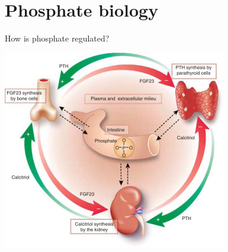 \documentclass[compress]{beamer}
\begin{document}
\section{Phosphate biology}
\begin{frame}{How is phosphate regulated?  }
	\begin{center}
		\includegraphics[scale=0.7]{physiology.jpg}
	\end{center}
	
\end{frame} 
\end{document}
